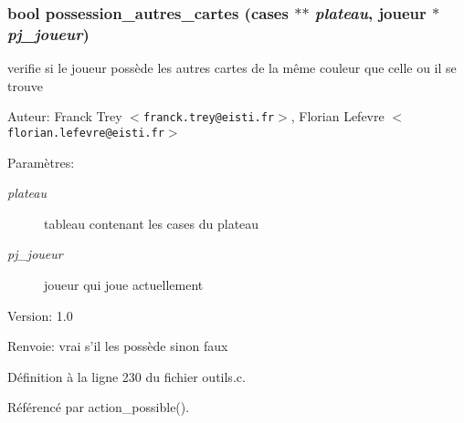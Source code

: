 \subsubsection{\setlength{\rightskip}{0pt plus 5cm}bool possession\_\-autres\_\-cartes ({\bf cases} $\ast$$\ast$ {\em plateau}, {\bf joueur} $\ast$ {\em pj\_\-joueur})}\label{outils_8c_914637efff042e343c9bb0befab2f609}


verifie si le joueur poss\`{e}de les autres cartes de la m\^{e}me couleur que celle ou il se trouve 

\begin{Desc}
\item[Auteur:]Franck Trey $<${\tt franck.trey@eisti.fr}$>$, Florian Lefevre $<${\tt florian.lefevre@eisti.fr}$>$\end{Desc}
\begin{Desc}
\item[Param\`{e}tres:]
\begin{description}
\item[{\em plateau}]tableau contenant les cases du plateau \item[{\em pj\_\-joueur}]joueur qui joue actuellement\end{description}
\end{Desc}
\begin{Desc}
\item[Version:]1.0 \end{Desc}
\begin{Desc}
\item[Renvoie:]vrai s'il les poss\`{e}de sinon faux \end{Desc}


D\'{e}finition \`{a} la ligne 230 du fichier outils.c.

R\'{e}f\'{e}renc\'{e} par action\_\-possible().

